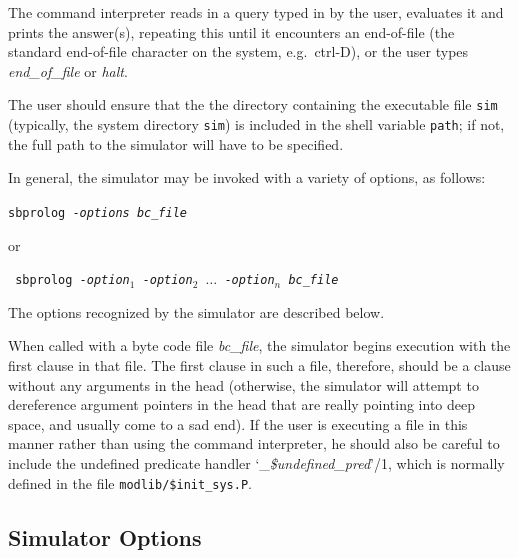 The command interpreter reads in a query typed in by the user,
evaluates it and prints the answer(s),
repeating this until it encounters an end-of-file
(the standard end-of-file character on the system, e.g.\ ctrl-D),
or the user types {\em end\_of\_file} or {\em halt}.

The user should ensure that the the directory containing the executable file
{\tt sim} (typically, the system directory {\tt sim})
is included in the shell variable {\tt path};
if not, the full path to the simulator will have to be specified.

In general, the simulator may be invoked with a variety of options,
as follows:
\begin{center}
{\tt sbprolog -{\em options} {\em bc\_\/file}}
\end{center}
or
\begin{tabbing}\tt
	sbprolog -{\em option}$_1$~-{\em option}$_2$~$\ldots$
	-{\em option$_n$} {\em bc\_file}
\end{tabbing}

The options recognized by the simulator are described below.

When called with a byte code file {\em bc\_\/file}, the simulator begins
execution with the first clause in that file.
The first clause in such a file,
therefore, should be a clause without any arguments in the head
(otherwise, the simulator will attempt to dereference argument pointers
in the head that are really pointing into deep space,
and usually come to a sad end).
If the user is executing a file in this manner rather than using the
command interpreter, he should also be careful to include the undefined
predicate handler `\_{\em \$undefined\_pred}'/1, which is normally defined
in the file {\tt modlib/\$init\_sys.P}.

\subsection{Simulator Options}\label{simulator_options}
 

